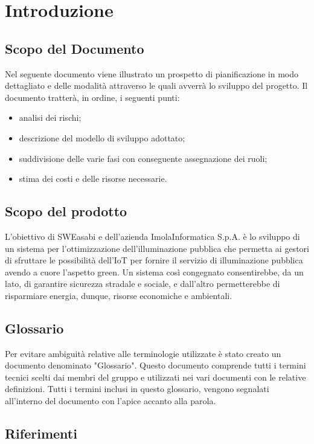 \chapter{Introduzione}

\section{Scopo del Documento}
Nel seguente documento viene illustrato un prospetto di pianificazione in modo dettagliato e delle modalità attraverso le quali avverrà lo sviluppo del progetto. Il documento tratterà, in ordine, i seguenti punti:
\begin{itemize}
    \item analisi dei rischi;
    \item descrizione del modello di sviluppo adottato;
    \item suddivisione delle varie fasi con conseguente assegnazione dei ruoli;
    \item stima dei costi e delle risorse necessarie.
\end{itemize}

\section{Scopo del prodotto}
L'obiettivo di SWEasabi e dell'azienda ImolaInformatica S.p.A. è lo sviluppo di un sistema per l'ottimizzazione dell'illuminazione pubblica che permetta ai gestori di sfruttare le possibilità dell'IoT per fornire il servizio di illuminazione pubblica avendo a cuore l'aspetto green. Un sistema così congegnato consentirebbe, da un lato, di garantire sicurezza stradale e sociale, e dall'altro permetterebbe di risparmiare energia, dunque, risorse economiche e ambientali.


\section{Glossario}
Per evitare ambiguità relative alle terminologie utilizzate è stato creato un documento denominato "Glossario". Questo documento comprende tutti i termini tecnici scelti dai membri del gruppo e utilizzati nei vari documenti con le relative definizioni. Tutti i termini inclusi in questo glossario, vengono segnalati all'interno del documento con l'apice accanto alla parola.

\section{Riferimenti}
